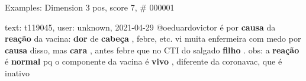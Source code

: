 \begin{frame}{Examples: Dimension 3 pos, score 7, \# 000001}
\footnotesize
\begin{exampleblock}{text: t119045, user: unknown, 2021-04-29}
@oeduardovictor é por \textbf{causa} da \textbf{reação} da vacina: \textbf{dor} 
de \textbf{cabeça} , febre, etc. vi muita enfermeira com medo por 
\textbf{causa} disso, mas \textbf{cara} , antes febre que no CTI do salgado 
\textbf{filho} . obs: a \textbf{reação} é \textbf{normal} pq o componente da 
vacina é \textbf{vivo} , diferente da coronavac, que é inativo 
\end{exampleblock}
\end{frame}
